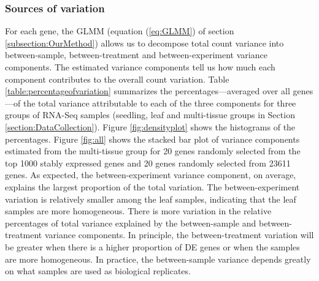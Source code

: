 	
	\subsubsection{Sources of variation}\label{Section:varianceComp}
	
	For each gene, the GLMM (equation (\ref{eq:GLMM}) of section
	\ref{subsection:OurMethod}) allows us to decompose total count variance into
	between-sample, between-treatment and between-experiment variance components.
	The estimated variance components tell us how much each component contributes
	to the overall count variation. Table \ref{table:percentageofvariation}
	summarizes the percentages---averaged over all genes---of the total variance
	attributable to each of the three components for three groups of RNA-Seq
	samples (seedling, leaf and multi-tissue groups in Section
	\ref{section:DataCollection}). Figure \ref{fig:densityplot} shows the
	histograms of the percentages.  Figure \ref{fig:all} shows the stacked bar
	plot of variance components estimated from the multi-tissue group for 20 genes
	randomly selected from the top 1000 stably expressed genes and 20 genes
	randomly selected from 23611 genes.  As expected, the between-experiment
	variance component, on average, explains the largest proportion of the total
	variation. The between-experiment variation is relatively smaller among the
	leaf samples, indicating that the leaf samples are more homogeneous.  There is
	more variation in the relative percentages of total variance explained by the
	between-sample and between-treatment variance components. In principle, the
	between-treatment variation will be greater when there is a higher proportion
	of DE genes or when the samples are more homogeneous. In practice, the
	between-sample variance depends greatly on what samples are used as biological
	replicates. 
	
	
